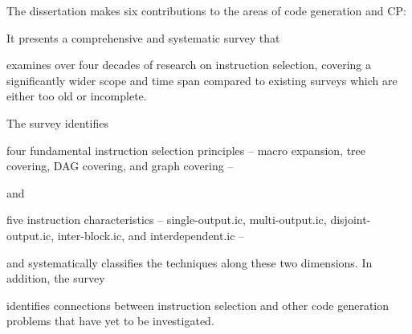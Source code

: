 The dissertation makes six contributions to the areas of \gls{code generation}
and \glsdesc{CP}:
%
\begin{contributions}
  \item {}
    It presents a comprehensive and systematic survey that
    \begin{contributions}
      \item {}
        examines over four decades of research on \gls{instruction selection},
        covering a significantly wider scope and time span compared to existing
        surveys \cite{Cattell:1977, GanapathiEtAl:1982:Survey, Lunell:1983,
          Leupers:2000:Survey, BoulytchevLomov:2001} which are either too old
        or incomplete.
    \end{contributions}
    The survey identifies%
    \begin{contributions}[resume]
      \item {}
        four fundamental \gls{instruction selection} \glspl{principle} --
        \gls{macro expansion}, \gls{tree covering}, \gls{DAG covering}, and
        \gls{graph covering} --
    \end{contributions}
    and
    \begin{contributions}[resume]
      \item {}
        five \glspl{instruction characteristic} -- \gls{single-output.ic},
        \gls{multi-output.ic}, \gls{disjoint-output.ic}, \gls{inter-block.ic},
        and \gls{interdependent.ic} --
    \end{contributions}
    and systematically classifies the techniques along these two dimensions.
    In addition, the survey
    \begin{contributions}[resume]
      \item {}
        identifies connections between \gls{instruction selection} and other
        \gls{code generation} problems that have yet to be investigated.
    \end{contributions}


\end{contributions}

